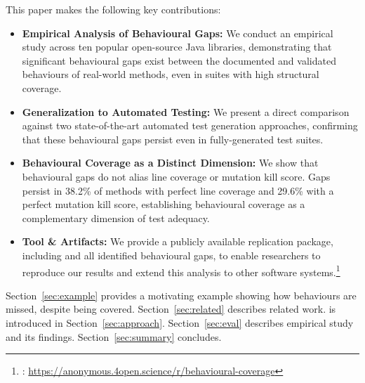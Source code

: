 This paper makes the following key contributions:
\begin{itemize}
    \item \textbf{Empirical Analysis of Behavioural Gaps:} We conduct an empirical study across ten popular open-source Java libraries, demonstrating that significant behavioural gaps exist between the documented and validated behaviours of real-world methods, even in suites with high structural coverage.
    
    \item \textbf{Generalization to Automated Testing:} We present a direct comparison against two state-of-the-art automated test generation approaches, confirming that these behavioural gaps persist even in fully-generated test suites.

    \item \textbf{Behavioural Coverage as a Distinct Dimension:} We show that behavioural gaps do not alias line coverage or mutation kill score. Gaps persist in 38.2\% of methods with perfect line coverage and 29.6\% with a perfect mutation kill score, establishing behavioural coverage as a complementary dimension of test adequacy. %
    
    \item \textbf{Tool \& Artifacts:} We provide a publicly available replication package, including \toolname{} and all identified behavioural gaps, to enable researchers to reproduce our results and extend this analysis to other software systems.\footnote{\toolname{}: \url{https://anonymous.4open.science/r/behavioural-coverage}}
\end{itemize}

\noindent Section~\ref{sec:example} provides a motivating example showing how behaviours are missed, despite being covered. Section~\ref{sec:related} describes related work. \toolname{} is introduced in Section~\ref{sec:approach}. Section~\ref{sec:eval} describes empirical study and its findings.
Section~\ref{sec:summary} concludes.

